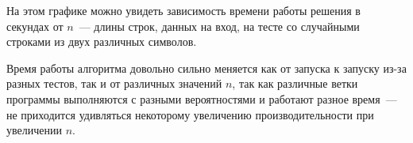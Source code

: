 На этом графике можно увидеть зависимость времени работы решения в секундах от $n$~--- длины строк, данных на вход, на тесте со случайными строками из двух различных символов.

Время работы алгоритма довольно сильно меняется как от запуска к запуску из-за разных тестов, так и от различных значений $n$, так как различные ветки программы выполняются с разными вероятностями и работают разное время~--- не приходится удивляться некоторому увеличению производительности при увеличении $n$.
